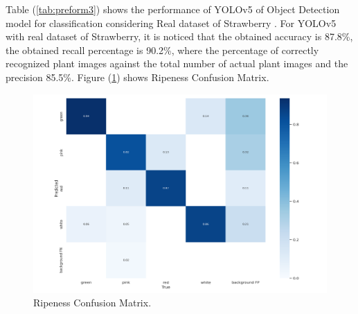 Table (\ref{tab:preform3}) shows the performance of YOLOv5 of Object Detection model for 
classification considering Real dataset of  Strawberry . For YOLOv5 with real dataset of 
Strawberry, it is noticed that the obtained accuracy is 87.8\%, the obtained recall percentage 
is 90.2\%, where the percentage of correctly recognized plant images against the total number 
of actual plant images and the precision 85.5\%.
Figure (\ref{fig:ripConf}) shows Ripeness Confusion Matrix.

\begin{figure}[H]
  \centering
  \includegraphics[width=12cm]{photos/chapter05/24.png}
  \caption{Ripeness Confusion Matrix.}
  \label{fig:ripConf}
\end{figure}

